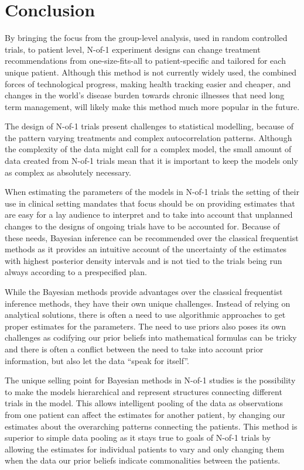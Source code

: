 \documentclass[12pt,a4paper,leqno]{report}
\theoremstyle{plain}
\theoremstyle{definition}
\theoremstyle{remark}
\begin{document}
\chapter{Conclusion}

By bringing the focus from the group-level analysis, used in random controlled trials, to patient
level, N-of-1 experiment designs can change treatment
recommendations from one-size-fits-all to patient-specific and tailored for
each unique patient. Although this method is not currently widely
used, the combined forces of technological progress, making
health tracking easier and cheaper, and changes in the world's disease burden towards
chronic illnesses that need long term management, will likely make this method much more
popular in the future.

The design of N-of-1 trials present challenges to statistical modelling, because
of the pattern varying treatments and complex autocorrelation patterns. Although the complexity
of the data might call for a complex model, the small amount of data created from N-of-1
trials mean that it is important to keep the models only as complex as absolutely
necessary.

When estimating the parameters of the models in N-of-1 trials the setting of their use
in clinical setting mandates that focus should be on providing estimates that are
easy for a lay audience to interpret and to take into account that unplanned
changes to the designs of ongoing trials have to be accounted for. Because of these
needs, Bayesian inference can be recommended over the classical
frequentist methods as it provides an intuitive account of the uncertainty of the estimates
with highest posterior density intervals and is not tied to the trials being run always
according to a prespecified plan.

While the Bayesian methods provide advantages over the classical frequentist inference
methods, they have their own unique challenges. Instead of relying on analytical
solutions, there is often a need to use algorithmic approaches to get proper
estimates for the parameters. The need to use priors also poses its own challenges as
codifying our prior beliefs into mathematical formulas can be tricky and there is often a
conflict between the need to take into account prior information, but also let the data ``speak
for itself''.

The unique selling point for Bayesian methods in N-of-1 studies is the possibility to
make the models hierarchical and represent structures connecting different trials in the
model. This allows intelligent pooling of the data as observations from one patient can
affect the estimates for another patient, by changing our estimates about the overarching
patterns connecting the patients. This method is superior to simple data pooling
as it stays true to goals of N-of-1 trials by allowing the estimates for individual
patients to vary and only changing them when the data our prior beliefs indicate commonalities
between the patients.
\end{document}
